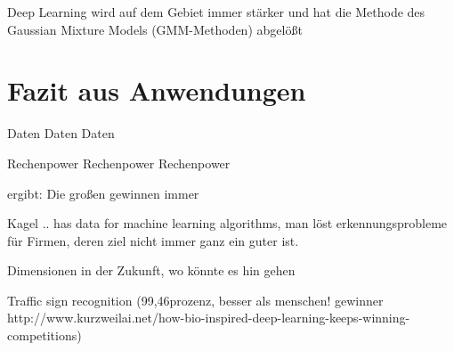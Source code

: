 Deep Learning wird auf dem Gebiet immer stärker und hat die Methode des Gaussian Mixture Models (GMM-Methoden) abgelößt




\section{Fazit aus Anwendungen}

Daten Daten Daten

Rechenpower Rechenpower Rechenpower

ergibt: Die großen gewinnen immer


Kagel .. has data for machine learning algorithms, man löst erkennungsprobleme für Firmen, deren ziel nicht immer ganz ein guter ist.


Dimensionen in der Zukunft, wo könnte es hin gehen

Traffic sign recognition (99,46prozenz, besser als menschen! gewinner http://www.kurzweilai.net/how-bio-inspired-deep-learning-keeps-winning-competitions)